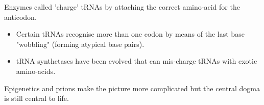 Enzymes called  'charge' tRNAs by attaching the correct amino-acid for the anticodon.
\begin{itemize}
    \item Certain tRNAs recognise more than one codon by means of the last base "wobbling" (forming atypical base pairs).
    \item tRNA synthetases have been evolved that can mis-charge tRNAs with exotic amino-acids.
\end{itemize}
Epigenetics and prions make the picture more complicated but the central dogma is still central to life.

